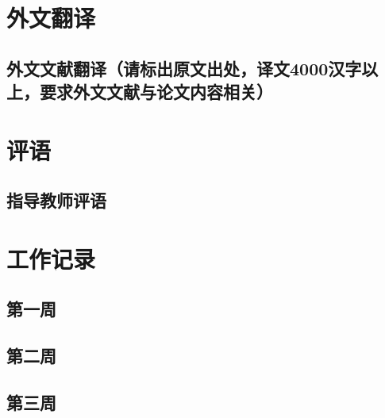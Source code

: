 \chapter{外文翻译}
\section{外文文献翻译（请标出原文出处，译文4000汉字以上，要求外文文献与论文内容相关）}

\chapter{评语}

\section{指导教师评语}

\chapter{工作记录}
\section{第一周}

\section{第二周}

\section{第三周}